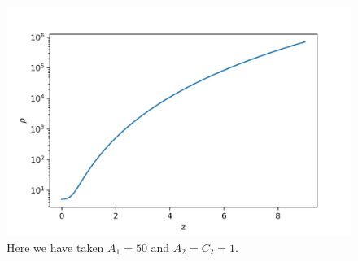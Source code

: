 \documentclass[a4paper, 11pt]{FSKH_623_Report}
\numberwithin{equation}{section}
\begin{document}
\begin{figure}[H]
\centering
\includegraphics[scale=0.65]{Figures/ch_rho.jpg}
\caption{Here we have taken $A_{1}=50$ and $A_{2}=C_{2}=1$. }
\label{fig:ChRho}
\end{figure}
\end{document}
